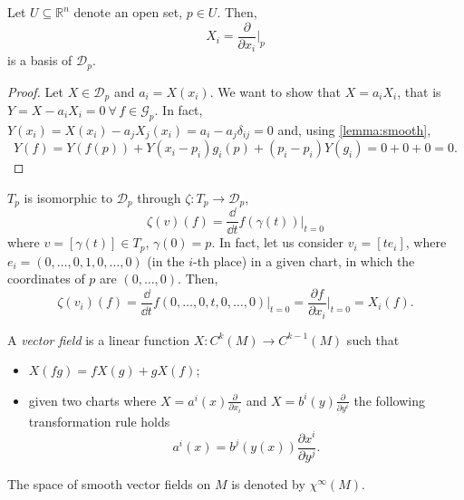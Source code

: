 \documentclass[a4paper,12pt]{book}
\begin{document}
\begin{theorem}
Let $U\subseteq\mathbb R^n$ denote an open set, $p\in U$. Then,
\[X_i=\frac{\partial}{\partial x_i}\bigg|_p\]
is a basis of $\mathcal D_p$.
\end{theorem}
\begin{proof}
Let $X\in\mathcal D_p$ and $a_i=X(x_i)$. We want to show that $X=a_iX_i$, that is $Y=X-a_iX_i=0\ \forall\,f\in\mathcal G_p$. In fact, $Y(x_i)=X(x_i)-a_jX_j(x_i)=a_i-a_j\delta_{ij}=0$ and, using \cref{lemma:smooth},
\[Y(f)=Y(f(p))+Y(x_i-p_i)g_i(p)+(p_i-p_i)Y(g_i)=0+0+0=0.\]
\end{proof}

$T_p$ is isomorphic to $\mathcal D_p$ through $\zeta\colon T_p\to\mathcal D_p$,
\[\zeta(v)(f)=\frac{\dd}{\dd t}f(\gamma(t))\bigg|_{t=0}\]
where $v=[\gamma(t)]\in T_p$, $\gamma(0)=p$. In fact, let us consider $v_i=[te_i]$, where $e_i=(0,\ldots,0,1,0,\ldots,0)$ (in the $i$-th place) in a given chart, in which the coordinates of $p$ are $(0,\ldots,0)$. Then,
\[\zeta(v_i)(f)=\frac{\dd}{\dd t}f(0,\ldots,0,t,0,\ldots,0)\bigg|_{t=0}=\frac{\partial f}{\partial x_i}\bigg|_{t=0}=X_i(f).\]

\begin{definition}
A \emph{vector field} is a linear function $X\colon C^k(M)\to C^{k-1}(M)$ such that
\begin{itemize}
\item $X(fg)=fX(g)+gX(f)$;
\item given two charts where $X=a^i(x)\frac{\partial}{\partial x_i}$ and $X=b^i(y)\frac{\partial}{\partial y^i}$ the following transformation rule holds
\[a^i(x)=b^j(y(x))\frac{\partial x^i}{\partial y^j}.\]
\end{itemize}
The space of smooth vector fields on $M$ is denoted by $\chi^\infty(M)$.
\end{definition}
\end{document}
